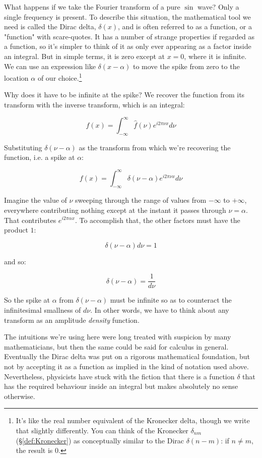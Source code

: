 What happens if we take the Fourier transform of a pure $\sin$ wave? Only a single frequency is present. To describe this situation, the mathematical tool we need is called the Dirac delta, $\delta(x)$, and is often referred to as a function, or a "function" with scare-quotes. It has a number of strange properties if regarded as a function, so it's simpler to think of it as only ever appearing as a factor inside an integral. But in simple terms, it is zero except at $x = 0$, where it is infinite. We can use an expression like $\delta(x - \alpha)$ to move the spike from zero to the location $\alpha$ of our choice.\footnote{It's like the real number equivalent of the Kronecker delta, though we write that slightly differently. You can think of the Kronecker $\delta_{nm}$ (§\ref{def:Kronecker}) as conceptually similar to the Dirac $\delta(n - m)$: if $n \ne m$, the result is $0$.}

Why does it have to be infinite at the spike? We recover the function from its transform with the inverse transform, which is an integral:

$$
f(x) = \int_{-\infty}^{\infty} \hat{f}(\nu)e^{i2\pi\nu x} d\nu
$$

Substituting $\delta(\nu - \alpha)$ as the transform from which we're recovering the function, i.e. a spike at $\alpha$:

$$
f(x) = \int_{-\infty}^{\infty} \delta(\nu - \alpha)e^{i2\pi\nu x} d\nu
$$

Imagine the value of $\nu$ sweeping through the range of values from $-\infty$ to $+\infty$, everywhere contributing nothing except at the instant it passes through $\nu = \alpha$. That contributes $e^{i2\pi\alpha x}$. To accomplish that, the other factors must have the product $1$:

$$
\delta(\nu - \alpha) d\nu = 1
$$

and so:

$$
\delta(\nu - \alpha) = \frac{1}{d\nu}
$$

So the spike at $\alpha$ from $\delta(\nu - \alpha)$ must be infinite so as to counteract the infinitesimal smallness of $d\nu$. In other words, we have to think about any transform as an amplitude \textit{density} function.

The intuitions we're using here were long treated with suspicion by many mathematicians, but then the same could be said for calculus in general. Eventually the Dirac delta was put on a rigorous mathematical foundation, but not by accepting it as a function as implied in the kind of notation used above. Nevertheless, physicists have stuck with the fiction that there is a function $\delta$ that has the required behaviour inside an integral but makes absolutely no sense otherwise.

